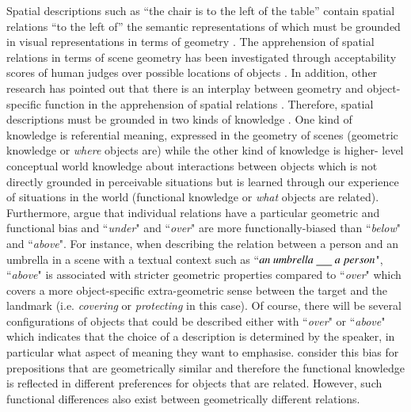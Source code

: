 Spatial descriptions such as ``the chair is to the left of the table'' contain
spatial relations ``to the left of'' the semantic representations of which must
be grounded in visual representations in terms of geometry
\cite{harnad1990symbol}. The apprehension of spatial relations in terms of
scene geometry has been investigated through acceptability scores of human
judges over possible locations of objects \cite{logan/sadler:1996}. In
addition, other research has pointed out that there is an interplay between
geometry and object-specific function in the apprehension of spatial relations
\cite{coventry2001interplay}.
Therefore, spatial descriptions must be grounded in two kinds of knowledge \cite{Landau:1993aa,coventry2001interplay,Coventry:2004aa,Landau:2016aa}.
One kind of knowledge is referential meaning, expressed in the geometry of
scenes (geometric knowledge or \emph{where} objects are) while the other kind of knowledge is higher-
level conceptual world knowledge about interactions between objects which is
not directly grounded in perceivable situations but is learned through our
experience of situations in the world (functional knowledge or \emph{what} objects are related).
Furthermore, \citet{coventry2001interplay} argue that individual relations have a
particular geometric and functional bias and
``\emph{under}" and ``\emph{over}" are more functionally-biased than ``\emph{below}" and ``\emph{above}". For instance, when describing the relation between a person and an umbrella in a scene with a textual context such as
``$an~umbrella~\underline{\hspace{0.5cm}}~a~person$", ``\emph{above}" is
associated with stricter geometric properties compared to ``\emph{over}" which
covers a more object-specific extra-geometric sense between the target and
the landmark (i.e. \emph{covering} or \emph{protecting} in this case). Of course, there will be several configurations of objects that could be described either with ``\emph{over}" or ``\emph{above}" which indicates that the choice of a description is determined by the speaker, in particular what aspect of meaning they want to emphasise. %
\citet{coventry2001interplay} consider this bias for prepositions that are geometrically similar and therefore the functional knowledge is reflected in different preferences for objects that are related. However, such functional differences also exist between geometrically different relations.


